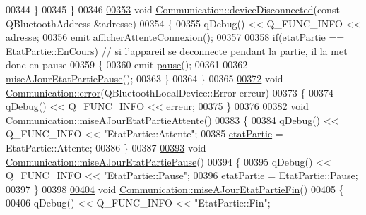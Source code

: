 \begin{DoxyCode}
00344     \}
00345 \}
00346 
\hyperlink{class_communication_a0ee021f517bb0e3f7149ed13f8faf0b1}{00353} \textcolor{keywordtype}{void} \hyperlink{class_communication_a0ee021f517bb0e3f7149ed13f8faf0b1}{Communication::deviceDisconnected}(\textcolor{keyword}{const} QBluetoothAddress &adresse)
00354 \{
00355     qDebug() << Q\_FUNC\_INFO << adresse;
00356     emit \hyperlink{class_communication_aff862483641966b73aa713b419b819a9}{afficherAttenteConnexion}();
00357 
00358     \textcolor{keywordflow}{if}(\hyperlink{class_communication_a2539ded2780db2c732690c585c768c96}{etatPartie} == EtatPartie::EnCours) \textcolor{comment}{// si l'appareil se deconnecte pendant la partie, il la
       met donc en pause}
00359     \{
00360         emit \hyperlink{class_communication_a369c7aeadc5c5926eb701bdebe53972c}{pause}();
00361 
00362         \hyperlink{class_communication_aaf8fbed545d460414fda14f23d5dca5d}{miseAJourEtatPartiePause}();
00363     \}
00364 \}
00365 
\hyperlink{class_communication_af95addb3c2bc178cfd7c92c6f94680a4}{00372} \textcolor{keywordtype}{void} \hyperlink{class_communication_af95addb3c2bc178cfd7c92c6f94680a4}{Communication::error}(QBluetoothLocalDevice::Error erreur)
00373 \{
00374     qDebug() << Q\_FUNC\_INFO << erreur;
00375 \}
00376 
\hyperlink{class_communication_a72557be8ab858096e03f08e78e036aeb}{00382} \textcolor{keywordtype}{void} \hyperlink{class_communication_a72557be8ab858096e03f08e78e036aeb}{Communication::miseAJourEtatPartieAttente}()
00383 \{
00384     qDebug() << Q\_FUNC\_INFO << \textcolor{stringliteral}{"EtatPartie::Attente"};
00385     \hyperlink{class_communication_a2539ded2780db2c732690c585c768c96}{etatPartie} = EtatPartie::Attente;
00386 \}
00387 
\hyperlink{class_communication_aaf8fbed545d460414fda14f23d5dca5d}{00393} \textcolor{keywordtype}{void} \hyperlink{class_communication_aaf8fbed545d460414fda14f23d5dca5d}{Communication::miseAJourEtatPartiePause}()
00394 \{
00395     qDebug() << Q\_FUNC\_INFO << \textcolor{stringliteral}{"EtatPartie::Pause"};
00396     \hyperlink{class_communication_a2539ded2780db2c732690c585c768c96}{etatPartie} = EtatPartie::Pause;
00397 \}
00398 
\hyperlink{class_communication_af6b9f4bf3b1df197ce20dccd9b78663f}{00404} \textcolor{keywordtype}{void} \hyperlink{class_communication_af6b9f4bf3b1df197ce20dccd9b78663f}{Communication::miseAJourEtatPartieFin}()
00405 \{
00406     qDebug() << Q\_FUNC\_INFO << \textcolor{stringliteral}{"EtatPartie::Fin"};

\end{DoxyCode}
